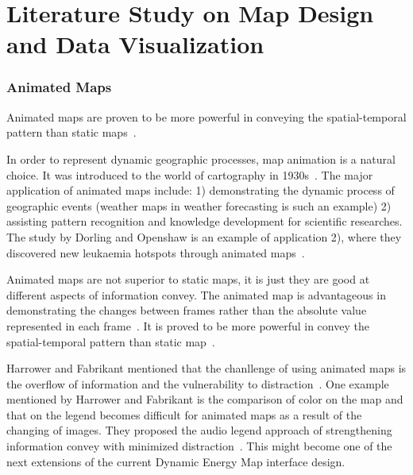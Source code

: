 
\chapter{Literature Study on Map Design and Data
  Visualization} %

\label{Chapter5} %


\subsection{Animated Maps}\label{anime}
Animated maps are proven to be more powerful in conveying the
spatial-temporal pattern than static maps~\cite{McEachern1998}.

In order to represent dynamic geographic processes, map animation is a
natural choice. It was introduced to the world of cartography in
1930s~\cite{Harrower2008}. The major application of animated maps
include: 1) demonstrating the dynamic process of geographic events
(weather maps in weather forecasting is such an example) 2) assisting
pattern recognition and knowledge development for scientific
researches. The study by Dorling and Openshaw is an example of 
application 2), where they discovered new leukaemia hotspots through
animated maps~\cite{Dorling1992}.

Animated maps are not superior to static maps, it is just they are
good at different aspects of information convey. The animated map is
advantageous in demonstrating the changes between frames rather than
the absolute value represented in each frame~\cite{Dorling1992}. It is
proved to be more powerful in convey the spatial-temporal pattern than
static map~\cite{McEachern1998}.

Harrower and Fabrikant mentioned that the chanllenge of using animated
maps is the overflow of information and the vulnerability to
distraction~\cite{Harrower2008}. One example mentioned by Harrower and
Fabrikant is the comparison of color on the map and that on the legend
becomes difficult for animated maps as a result of the changing of
images. They proposed the audio legend approach of strengthening
information convey with minimized
distraction~\cite{Harrower2008}. This might become one of the next
extensions of the current Dynamic Energy Map interface design.

